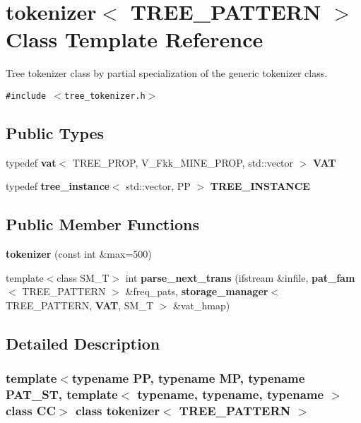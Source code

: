 \section{tokenizer$<$ TREE\_\-PATTERN $>$ Class Template Reference}
\label{classtokenizer_3_01TREE__PATTERN_01_4}
Tree tokenizer class by partial specialization of the generic tokenizer class.  


{\tt \#include $<$tree\_\-tokenizer.h$>$}

\subsection*{Public Types}
\begin{CompactItemize}
\item 
typedef {\bf vat}$<$ TREE\_\-PROP, V\_\-Fkk\_\-MINE\_\-PROP, std::vector $>$ {\bf VAT}\label{classtokenizer_3_01TREE__PATTERN_01_4_w0}

\item 
typedef {\bf tree\_\-instance}$<$ std::vector, PP $>$ {\bf TREE\_\-INSTANCE}\label{classtokenizer_3_01TREE__PATTERN_01_4_w1}

\end{CompactItemize}
\subsection*{Public Member Functions}
\begin{CompactItemize}
\item 
{\bf tokenizer} (const  int \&max=500)\label{classtokenizer_3_01TREE__PATTERN_01_4_a0}

\item 
template$<$class SM\_\-T$>$ int {\bf parse\_\-next\_\-trans} (ifstream \&infile, {\bf pat\_\-fam}$<$ TREE\_\-PATTERN $>$ \&freq\_\-pats, {\bf storage\_\-manager}$<$ TREE\_\-PATTERN, {\bf VAT}, SM\_\-T $>$ \&vat\_\-hmap)
\end{CompactItemize}


\subsection{Detailed Description}
\subsubsection*{template$<$typename PP, typename MP, typename PAT\_\-ST, template$<$ typename, typename, typename $>$ class CC$>$ class tokenizer$<$ TREE\_\-PATTERN $>$}

